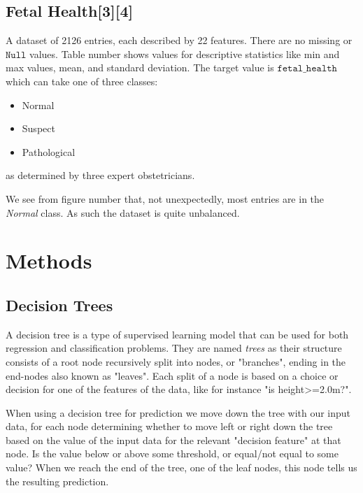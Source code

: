 \documentclass[11pt]{article}
\begin{document}
    \hypertarget{fetal-health}{%
\subsection{Fetal Health[3][4]}\label{fetal-health}}

A dataset of 2126 entries, each described by 22 features. There are no
missing or $\texttt{Null}$ values. Table number shows values for descriptive
statistics like min and max values, mean, and standard deviation. The
target value is \(\texttt{fetal\_health}\) which can take one of three
classes:
\begin{itemize}
	\item Normal
	\item Suspect
	\item Pathological
\end{itemize}
as determined by three expert obstetricians.

We see from figure number that, not unexpectedly, most entries are in
the \emph{Normal} class. As such the dataset is quite unbalanced.

    \hypertarget{methods}{%
\section{Methods}\label{methods}}

    \hypertarget{decision-trees}{%
\subsection{Decision Trees}\label{decision-trees}}

A decision tree is a type of supervised learning model that can be used
for both regression and classification problems. They are named
\emph{trees} as their structure consists of a root node recursively
split into nodes, or "branches", ending in the end-nodes also known as
"leaves". Each split of a node is based on a choice or decision for
one of the features of the data, like for instance "is
height\textgreater=2.0m?".

When using a decision tree for prediction we move down the tree with our
input data, for each node determining whether to move left or right down
the tree based on the value of the input data for the relevant
"decision feature" at that node. Is the value below or above some
threshold, or equal/not equal to some value? When we reach the end of
the tree, one of the leaf nodes, this node tells us the resulting
prediction.
\end{document}
